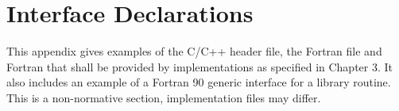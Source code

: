 %
%
%
%
%
%
%
%
%
%
%
%
%



\chapter{Interface Declarations}
\label{chap:Interface Declarations}
This appendix gives examples of the C/C++ header file, the Fortran  file and 
Fortran  that shall be provided by implementations as specified in Chapter 3. It 
also includes an example of a Fortran 90 generic interface for a library routine. This is a 
non-normative section, implementation files may differ.




